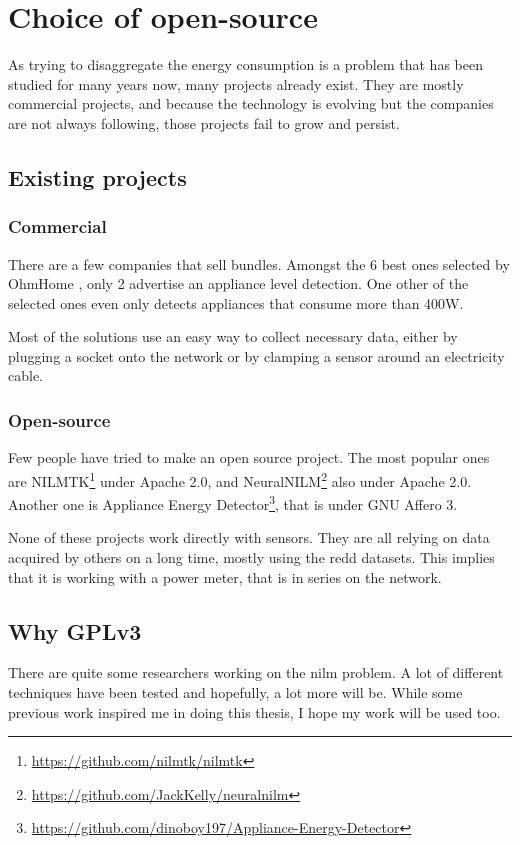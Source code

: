 \chapter{Choice of open-source}\label{section:open-source}
As trying to disaggregate the energy consumption is a problem that has been studied for many years now, many projects already exist. They are mostly commercial projects, and because the technology is evolving but the companies are not always following, those projects fail to grow and persist.

\section{Existing projects}
\subsection{Commercial}
There are a few companies that sell bundles. Amongst the 6 best ones selected by OhmHome \cite{opensourcelist}, only 2 advertise an appliance level detection. One other of the selected ones even only detects appliances that consume more than 400W.

Most of the solutions use an easy way to collect necessary data, either by plugging a socket onto the network or by clamping a sensor around an electricity cable.
\subsection{Open-source}
Few people have tried to make an open source project. The most popular ones are NILMTK\footnote{\url{https://github.com/nilmtk/nilmtk}}\cite{batra2014nilmtk} under Apache 2.0, and NeuralNILM\footnote{\url{https://github.com/JackKelly/neuralnilm}}\cite{kelly2015neural} also under Apache 2.0. Another one is Appliance Energy Detector\footnote{\url{https://github.com/dinoboy197/Appliance-Energy-Detector}}, that is under GNU Affero 3.

None of these projects work directly with sensors. They are all relying on data acquired by others on a long time, mostly using the \acrshort{redd} datasets. This implies that it is working with a power meter, that is in series on the network.
\section{Why GPLv3}
There are quite some researchers working on the \acrshort{nilm} problem. A lot of different techniques have been tested and hopefully, a lot more will be. While some previous work inspired me in doing this thesis, I hope my work will be used too.

